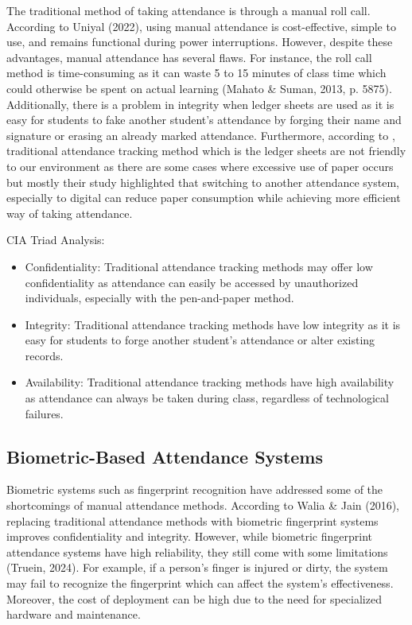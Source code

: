 The traditional method of taking attendance is through a manual roll call. According to Uniyal (2022), using manual attendance is cost-effective, simple to use, and remains functional during power interruptions. However, despite these advantages, manual attendance has several flaws. For instance, the roll call method is time-consuming as it can waste 5 to 15 minutes of class time which could otherwise be spent on actual learning (Mahato \& Suman, 2013, p. 5875). Additionally, there is a problem in integrity when ledger sheets are used as it is easy for students to fake another student’s attendance by forging their name and signature or erasing an already marked attendance. Furthermore, according to \cite{dewa2020development},  traditional attendance tracking method which is the ledger sheets are not friendly to our environment as there are some cases where excessive use of paper occurs but mostly their study highlighted that switching to another attendance system, especially to digital can reduce paper consumption while achieving more efficient way of taking attendance. 

CIA Triad Analysis:

\begin{itemize}
	\item Confidentiality: Traditional attendance tracking methods may offer low confidentiality as attendance can easily be accessed by unauthorized individuals, especially with the pen-and-paper method.
	\item Integrity: Traditional attendance tracking methods have low integrity as it is easy for students to forge another student's attendance or alter existing records.
	\item Availability: Traditional attendance tracking methods have high availability as attendance can always be taken during class, regardless of technological failures.
\end{itemize}

\subsection{Biometric-Based Attendance Systems}

Biometric systems such as fingerprint recognition have addressed some of the shortcomings of manual attendance methods. According to Walia \& Jain (2016), replacing traditional attendance methods with biometric fingerprint systems improves confidentiality and integrity. However, while biometric fingerprint attendance systems have high reliability, they still come with some limitations (Truein, 2024). For example, if a person’s finger is injured or dirty, the system may fail to recognize the fingerprint which can affect the system’s effectiveness. Moreover, the cost of deployment can be high due to the need for specialized hardware and maintenance.

